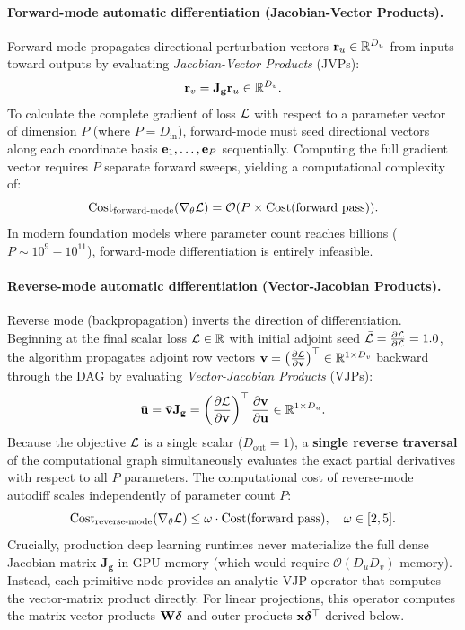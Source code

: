 \documentclass[../../main.tex]{subfiles}
\begin{document}
\paragraph{Forward-mode automatic differentiation (Jacobian-Vector Products).}
Forward mode propagates directional perturbation vectors $\mathbf{r}_u \in \mathbb{R}^{D_u}$ from inputs toward outputs by evaluating \emph{Jacobian-Vector Products} (JVPs):
\begin{equation}
\mathbf{r}_v = \mathbf{J}_{\mathbf{g}} \mathbf{r}_u \in \mathbb{R}^{D_v}.
\end{equation}
To calculate the complete gradient of loss $\mathcal{L}$ with respect to a parameter vector of dimension $P$ (where $P = D_{\text{in}}$), forward-mode must seed directional vectors along each coordinate basis $\mathbf{e}_1, \dots, \mathbf{e}_P$ sequentially. Computing the full gradient vector requires $P$ separate forward sweeps, yielding a computational complexity of:
\begin{equation}
\text{Cost}_{\text{forward-mode}}(\nabla_\theta \mathcal{L}) = \mathcal{O}(P \times \text{Cost}(\text{forward pass})).
\end{equation}
In modern foundation models where parameter count reaches billions ($P \sim 10^9 - 10^{11}$), forward-mode differentiation is entirely infeasible.

\paragraph{Reverse-mode automatic differentiation (Vector-Jacobian Products).}
Reverse mode (backpropagation) inverts the direction of differentiation. Beginning at the final scalar loss $\mathcal{L} \in \mathbb{R}$ with initial adjoint seed $\bar{\mathcal{L}} = \frac{\partial \mathcal{L}}{\partial \mathcal{L}} = 1.0$, the algorithm propagates adjoint row vectors $\bar{\mathbf{v}} = \left(\frac{\partial \mathcal{L}}{\partial \mathbf{v}}\right)^\top \in \mathbb{R}^{1 \times D_v}$ backward through the DAG by evaluating \emph{Vector-Jacobian Products} (VJPs):
\begin{equation}
\label{eq:vjp_equation}
\bar{\mathbf{u}} = \bar{\mathbf{v}} \mathbf{J}_{\mathbf{g}} = \left(\frac{\partial \mathcal{L}}{\partial \mathbf{v}}\right)^\top \frac{\partial \mathbf{v}}{\partial \mathbf{u}} \in \mathbb{R}^{1 \times D_u}.
\end{equation}
Because the objective $\mathcal{L}$ is a single scalar ($D_{\text{out}} = 1$), a \textbf{single reverse traversal} of the computational graph simultaneously evaluates the exact partial derivatives with respect to all $P$ parameters. The computational cost of reverse-mode autodiff scales independently of parameter count $P$:
\begin{equation}
\text{Cost}_{\text{reverse-mode}}(\nabla_\theta \mathcal{L}) \le \omega \cdot \text{Cost}(\text{forward pass}), \quad \omega \in [2, 5].
\end{equation}
Crucially, production deep learning runtimes never materialize the full dense Jacobian matrix $\mathbf{J}_{\mathbf{g}}$ in GPU memory (which would require $\mathcal{O}(D_u D_v)$ memory). Instead, each primitive node provides an analytic VJP operator that computes the vector-matrix product directly. For linear projections, this operator computes the matrix-vector products $\mathbf{W} \bm{\delta}$ and outer products $\mathbf{x} \bm{\delta}^\top$ derived below.
\end{document}
